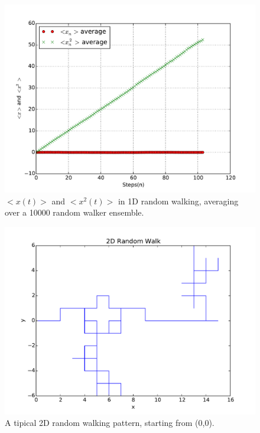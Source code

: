 \documentclass[aps,prl,preprint,superscriptaddress]{revtex4}
\begin{document}
		\begin{figure}[H]
			\centering
			\includegraphics[width=1.0\textwidth]{rwxn.pdf}
			\caption{$ <x(t)> $ and  $ <x^2(t)> $ in 1D random walking, averaging over a 10000 random walker ensemble.}
		\end{figure}
			\begin{figure}[H]
				\centering
				\includegraphics[width=1.0\textwidth]{rwxn3.pdf}
				\caption{A tipical 2D random walking pattern, starting from (0,0).}
			\end{figure}
\end{document}

